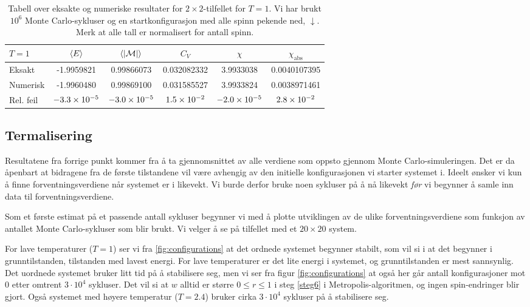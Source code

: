 \documentclass[11pt]{article}
\newcommand{\abs}[1]{|#1|}
\begin{document}
\begin{table}
\centering
\caption{Tabell over eksakte og numeriske resultater for $2\times
  2$-tilfellet for $T=1$. Vi har brukt $10^6$ Monte Carlo-sykluser og
  en startkonfigurasjon med alle spinn pekende ned, $\downarrow$. Merk at
alle tall er normalisert for antall spinn.}
\label{tab:2x2-eksakt-num}
\vspace{0.1cm}
\begin{tabular}{l|ccccc}
$T=1$ & $\langle E \rangle$ & $\mean{ \abs{\mathcal{M} } }$ & $C_V$ & $\chi$ & $\chi_\text{abs}$ \\
\hline
Eksakt & -1.9959821 & 0.99866073 & 0.032082332 & 3.9933038 & 0.0040107395 \\
Numerisk & -1.9960480 & 0.99869100 & 0.031585527 & 3.9933824 & 0.0038971461 \\
Rel. feil & $-3.3\times 10^{-5}$ & $-3.0\times 10^{-5}$ & $1.5\times 10^{-2}$  & $-2.0\times 10^{-5}$ & $2.8\times 10^{-2}$ 
\end{tabular}
\end{table}



\subsection{Termalisering}
Resultatene fra forrige punkt kommer fra å ta gjennomsnittet av alle
verdiene som oppsto gjennom Monte Carlo-simuleringen. Det er da
åpenbart at bidragene fra de første tilstandene vil være avhengig av
den initielle konfigurasjonen vi starter systemet i. Ideelt ønsker vi
kun å finne forventningsverdiene når systemet er i likevekt. Vi burde
derfor bruke noen sykluser på å nå likevekt \textit{før} vi
begynner å samle inn data til forventningsverdiene. 

Som et første estimat på et passende antall sykluser begynner vi med å
plotte utviklingen av de ulike forventningsverdiene som funksjon av
antallet Monte Carlo-sykluser som blir brukt. Vi velger å se på
tilfellet med et $20\times 20$ system. 

For lave temperaturer ($T = 1$) ser vi fra \ref{fig:configurations} at det ordnede systemet
begynner stabilt, som vil si i at det begynner i grunntilstanden,
tilstanden med lavest energi. For lave temperaturer er det lite energi
i systemet, og grunntilstanden er mest sannsynlig. Det uordnede 
systemet bruker litt tid på å stabilisere seg, men vi ser fra
figur \ref{fig:configurations} at også her går antall konfigurasjoner mot 0
etter omtrent $3 \cdot 10^4$ sykluser. Det vil si at $w$ alltid er
større $0\leq r\leq 1$ i steg \ref{steg6} i Metropolis-algoritmen,
og ingen spin-endringer blir gjort. Også systemet med høyere
temperatur ($T=2.4$) bruker cirka $3 \cdot 10^4$ sykluser på å
stabilisere seg.
\end{document}
